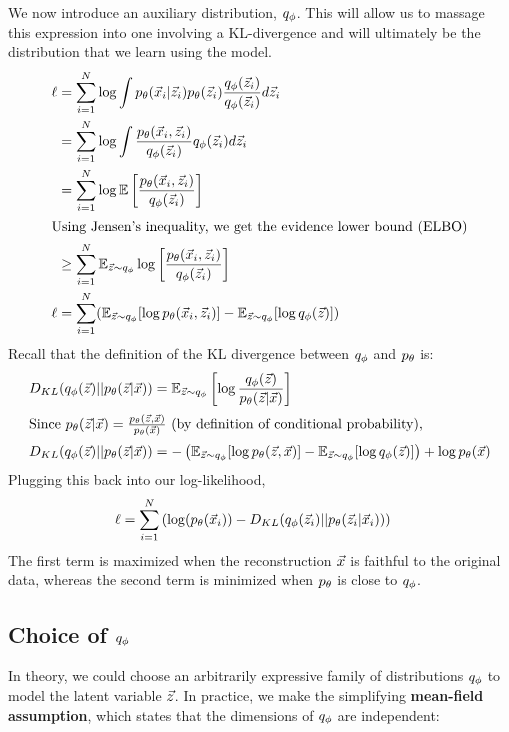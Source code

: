 We now introduce an auxiliary distribution, $q_\phi$. This will allow us to massage this expression into one involving a KL-divergence and will ultimately be the distribution that we learn using the model.
\begin{align*}
    \ell &= \sum_{i=1}^N\log\int p_\theta(\vec{x}_i|\vec{z}_i)p_\theta(\vec{z}_i)\frac{q_\phi(\vec{z}_i)}{q_\phi(\vec{z}_i)}d\vec{z}_i \\
    &= \sum_{i=1}^N\log\int\frac{p_\theta(\vec{x}_i,\vec{z}_i)}{q_\phi(\vec{z}_i)}q_\phi(\vec{z}_i)d\vec{z}_i \\
    &= \sum_{i=1}^N\log\mathbb{E}\left[\frac{p_\theta(\vec{x}_i,\vec{z}_i)}{q_\phi(\vec{z}_i)}\right] \\
    \intertext{Using Jensen's inequality, we get the evidence lower bound (ELBO)}
    &\geq \sum_{i=1}^N\mathbb{E}_{\vec{z}\sim q_\phi}\log\left[\frac{p_\theta(\vec{x}_i,\vec{z}_i)}{q_\phi(\vec{z}_i)}\right] \\
    \ell &= \sum_{i=1}^N(\mathbb{E}_{\vec{z}\sim q_\phi}[\log p_\theta(\vec{x}_i, \vec{z}_i)] - \mathbb{E}_{\vec{z}\sim q_\phi}[\log q_\phi(\vec{z})])
\end{align*}
Recall that the definition of the KL divergence between $q_\phi$ and $p_\theta$ is:
\begin{align*}
    D_{KL}(q_\phi(\vec{z})||p_\theta(\vec{z}|\vec{x})) &= \mathbb{E}_{\vec{z}\sim q_\phi}\left[ \log\frac{q_\phi(\vec{z})}{p_\theta(\vec{z}|\vec{x})} \right] \\
    \intertext{Since $p_\theta(\vec{z}|\vec{x}) = \frac{p_\theta(\vec{z},\vec{x})}{p_\theta(\vec{x})}$ (by definition of conditional probability),}
    D_{KL}(q_\phi(\vec{z})||p_\theta(\vec{z}|\vec{x})) &= -\left( \mathbb{E}_{\vec{z}\sim q_\phi}[\log p_\theta(\vec{z},\vec{x})] - \mathbb{E}_{\vec{z}\sim q_\phi}[\log q_\phi(\vec{z})]\right) + \log p_\theta(\vec{x})
\end{align*}
Plugging this back into our log-likelihood,
\begin{align*}
    \ell &= \sum_{i=1}^N\left( \log(p_\theta(\vec{x}_i)) - D_{KL}(q_\phi(\vec{z}_i)||p_\theta(\vec{z}_i|\vec{x}_i)) \right)
\end{align*}
The first term is maximized when the reconstruction $\vec{x}$ is faithful to the original data, whereas the second term is minimized when $p_\theta$ is close to $q_\phi$.

\subsection{Choice of $q_\phi$}

In theory, we could choose an arbitrarily expressive family of distributions $q_\phi$ to model the latent variable $\vec{z}$. In practice, we make the simplifying {\bf mean-field assumption}, which states that the dimensions of $q_\phi$ are independent:

